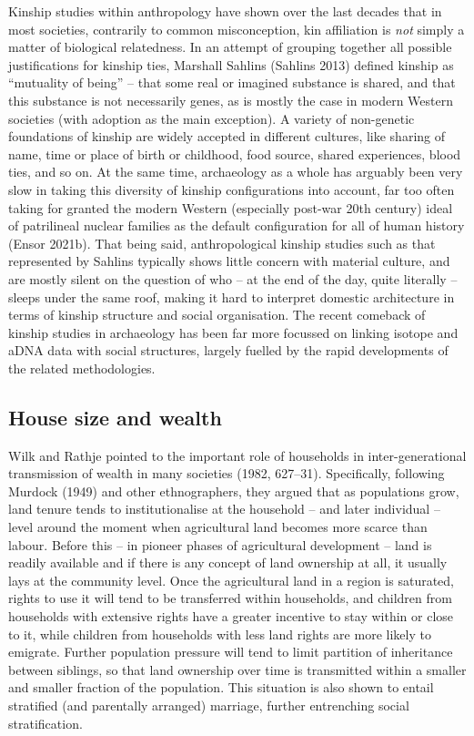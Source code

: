 \documentclass[
  12pt,
  a4paper, twoside]{book}
\begin{document}
Kinship studies within anthropology have shown over the last decades that in most societies, contrarily to common misconception, kin affiliation is \emph{not} simply a matter of biological relatedness. In an attempt of grouping together all possible justifications for kinship ties, Marshall Sahlins (Sahlins 2013) defined kinship as ``mutuality of being'' -- that some real or imagined substance is shared, and that this substance is not necessarily genes, as is mostly the case in modern Western societies (with adoption as the main exception). A variety of non-genetic foundations of kinship are widely accepted in different cultures, like sharing of name, time or place of birth or childhood, food source, shared experiences, blood ties, and so on. At the same time, archaeology as a whole has arguably been very slow in taking this diversity of kinship configurations into account, far too often taking for granted the modern Western (especially post-war 20th century) ideal of patrilineal nuclear families as the default configuration for all of human history (Ensor 2021b). That being said, anthropological kinship studies such as that represented by Sahlins typically shows little concern with material culture, and are mostly silent on the question of who -- at the end of the day, quite literally -- sleeps under the same roof, making it hard to interpret domestic architecture in terms of kinship structure and social organisation. The recent comeback of kinship studies in archaeology has been far more focussed on linking isotope and aDNA data with social structures, largely fuelled by the rapid developments of the related methodologies.

\hypertarget{house-size-and-wealth}{%
\subsection{House size and wealth}\label{house-size-and-wealth}}

Wilk and Rathje pointed to the important role of households in inter-generational transmission of wealth in many societies (1982, 627--31). Specifically, following Murdock (1949) and other ethnographers, they argued that as populations grow, land tenure tends to institutionalise at the household -- and later individual -- level around the moment when agricultural land becomes more scarce than labour. Before this -- in pioneer phases of agricultural development -- land is readily available and if there is any concept of land ownership at all, it usually lays at the community level. Once the agricultural land in a region is saturated, rights to use it will tend to be transferred within households, and children from households with extensive rights have a greater incentive to stay within or close to it, while children from households with less land rights are more likely to emigrate. Further population pressure will tend to limit partition of inheritance between siblings, so that land ownership over time is transmitted within a smaller and smaller fraction of the population. This situation is also shown to entail stratified (and parentally arranged) marriage, further entrenching social stratification.
\end{document}
